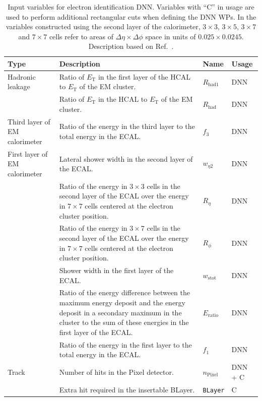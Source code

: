 {\scriptsize
\begin{longtable}{p{2.3cm}p{7cm}p{1.5cm}p{1.5cm}}
  \caption{Input variables for electron identification DNN. Variables with ``C'' in usage are used to perform additional rectangular cuts when defining the DNN WPs. In the variables constructed using the second layer of the calorimeter, $3\times3$, $3\times5$, $3\times7$ and $7\times7$ cells refer to areas of $\Delta \eta \times \Delta \phi$ space in units of $0.025\times0.0245$. Description based on Ref.~\cite{dnn_paper}.}\\
  \toprule
  \textbf{Type} & \textbf{Description} & \textbf{Name} & \textbf{Usage} \\
  \midrule
  \endfirsthead
  \midrule
  \endhead
  Hadronic leakage & Ratio of $E_{\text{T}}$ in the first layer of the HCAL to $E_{\text{T}}$ of the EM cluster. & $R_{\text{had1}}$ & DNN \\
   & Ratio of $E_{\text{T}}$ in the HCAL to $E_{\text{T}}$ of the EM cluster. & $R_{\text{had}}$ & DNN \\
  \midrule
  Third layer of EM calorimeter & Ratio of the energy in the third layer to the total energy in the ECAL. & $f_3$ & DNN \\
  \midrule
  First layer of EM calorimeter & Lateral shower width in the second layer of the ECAL. & $w_{\eta2}$ & DNN \\
   & Ratio of the energy in $3{\times}3$ cells in the second layer of the ECAL over the energy in $7{\times}7$ cells centered at the electron cluster position. & $R_{\eta}$ & DNN \\
   & Ratio of the energy in $3{\times}7$ cells in the second layer of the ECAL over the energy in $7{\times}7$ cells centered at the electron cluster position. & $R_{\phi}$ & DNN \\
   & Shower width in the first layer of the ECAL. & $w_{\text{stot}}$ & DNN\\
   & Ratio of the energy difference between the maximum energy deposit and the energy deposit in a secondary maximum in the cluster to the sum of these energies in the first layer of the ECAL. & $E_{\text{ratio}}$ & DNN \\
   & Ratio of the energy in the first layer to the total energy in the ECAL. & $f_1$ & DNN \\
  \midrule
  Track  & Number of hits in the Pixel detector. & $n_{\text{Pixel}}$ & DNN + C \\
   & Extra hit required in the insertable BLayer. & \texttt{BLayer} & C \\

\end{longtable}}
